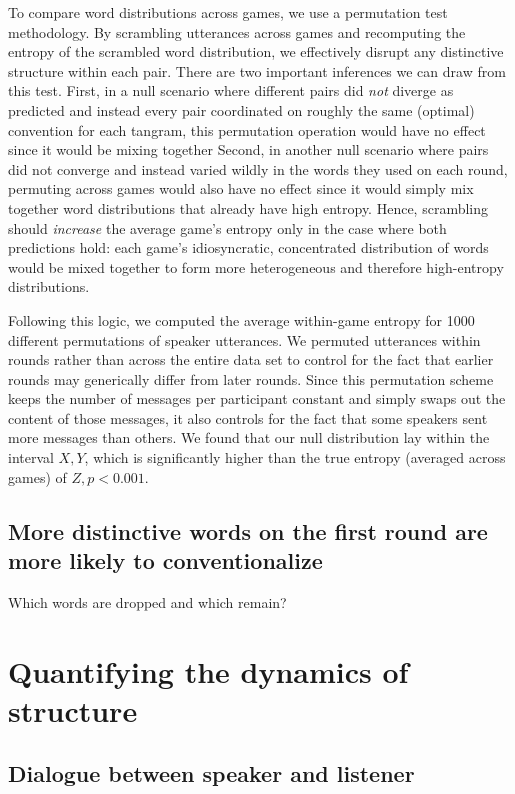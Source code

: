 \documentclass[alpha-refs]{wiley-article}
\begin{document}
To compare word distributions across games, we use a permutation test methodology.
By scrambling utterances across games and recomputing the entropy of the scrambled word distribution, we effectively disrupt any distinctive structure within each pair.
There are two important inferences we can draw from this test.
First, in a null scenario where different pairs did \emph{not} diverge as predicted and instead every pair coordinated on roughly the same (optimal) convention for each tangram, this permutation operation would have no effect since it would be mixing together 
Second, in another null scenario where pairs did not converge and instead varied wildly in the words they used on each round, permuting across games would also have no effect since it would simply mix together word distributions that already have high entropy.
Hence, scrambling should \emph{increase} the average game's entropy only in the case where both predictions hold: each game's idiosyncratic, concentrated distribution of words would be mixed together to form more heterogeneous and therefore high-entropy distributions.

Following this logic, we computed the average within-game entropy for 1000 different permutations of speaker utterances. 
We permuted utterances within rounds rather than across the entire data set to control for the fact that earlier rounds may generically differ from later rounds. 
Since this permutation scheme keeps the number of messages per participant constant and simply swaps out the content of those messages, it also controls for the fact that some speakers sent more messages than others. 
We found that our null distribution lay within the interval $X, Y$, which is significantly higher than the true entropy (averaged across games) of $Z, p < 0.001$.


\subsection{More distinctive words on the first round are more likely to conventionalize}

Which words are dropped and which remain?


\section{Quantifying the dynamics of structure}\label{results}

\subsection{Dialogue between speaker and listener}\label{listener-feedback}
\end{document}
